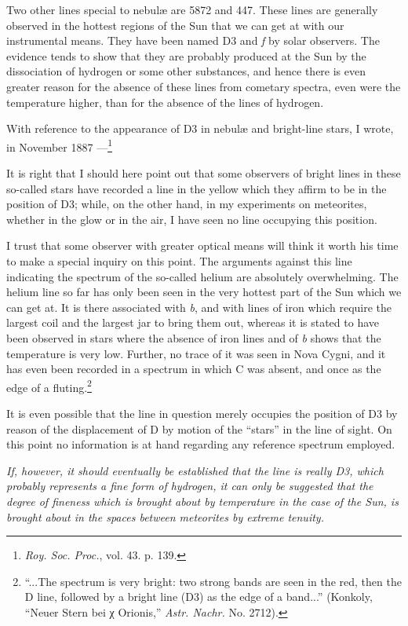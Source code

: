 \documentclass[a4paper, 12pt, oneside, polutonikogreek, english]{article}
\begin{document}
Two other lines special to nebulæ are 5872 and 447. These lines are generally observed in the hottest regions of the Sun that we can get at with our instrumental means. They have been named D3 and \emph{f} by solar observers. The evidence tends to show that they are probably produced at the Sun by the dissociation of hydrogen or some other substances, and hence there is even greater reason for the absence of these lines from cometary spectra, even were the temperature higher, than for the absence of the lines of hydrogen.

With reference to the appearance of D3 in nebulæ and bright-line stars, I wrote, in November 1887 ---\footnote{\emph{Roy. Soc. Proc.}, vol. 43. p. 139.}

It is right that I should here point out that some observers of bright lines in these so-called stars have recorded a line in the yellow which they affirm to be in the position of D3; while, on the other hand, in my experiments on meteorites, whether in the glow or in the air, I have seen no line occupying this position.

I trust that some observer with greater optical means will think it worth his time to make a special inquiry on this point. The arguments against this line indicating the spectrum of the so-called helium are absolutely overwhelming. The helium line so far has only been seen in the very hottest part of the Sun which we can get at. It is there associated with \emph{b}, and with lines of iron which require the largest coil and the largest jar to bring them out, whereas it is stated to have been observed in stars where the absence of iron lines and of \emph{b} shows that the temperature is very low. Further, no trace of it was seen in Nova Cygni, and it has even been recorded in a spectrum in which C was absent, and once as the edge of a fluting.\footnote{``...The spectrum is very bright: two strong bands are seen in the red, then the D line, followed by a bright line (D3) as the edge of a band...'' (Konkoly, ``Neuer Stern bei χ Orionis,'' \emph{Astr. Nachr.} No. 2712).}

It is even possible that the line in question merely occupies the position of D3 by reason of the displacement of D by motion of the ``stars'' in the line of sight. On this point no information is at hand regarding any reference spectrum employed.

\emph{If, however, it should eventually be established that the line is really D3, which probably represents a fine form of hydrogen, it can only be suggested that the degree of fineness which is brought about by temperature in the case of the Sun, is brought about in the spaces between meteorites by extreme tenuity.}
\end{document}
